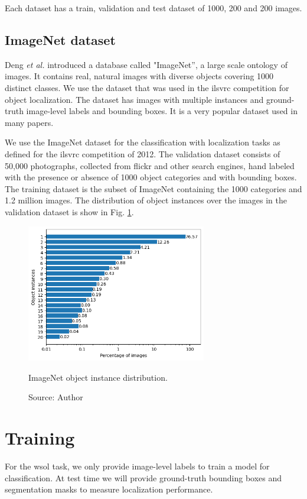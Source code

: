 Each dataset has a train, validation and test dataset of 1000, 200 and 200 images.

\subsection{ImageNet dataset}
Deng \textit{et al.} \cite{deng2009imagenet} introduced a database called "ImageNet”, a large scale ontology of images. It contains real, natural images with diverse objects covering 1000 distinct classes. We use the dataset that was used in the \acrfull{ilsvrc} competition for object localization. The dataset has images with multiple instances and ground-truth image-level labels and bounding boxes. It is a very popular dataset used in many papers.

We use the ImageNet dataset for the classification with localization tasks as defined for the \acrfull{ilsvrc} competition of 2012. The validation dataset consists of 50,000 photographs, collected from flickr and other search engines, hand labeled with the presence or absence of 1000 object categories and with bounding boxes. The training dataset is the subset of ImageNet containing the 1000 categories and 1.2 million images. The distribution of object instances over the images in the validation dataset is show in Fig. \ref{fig:imagenet_instance_distribution}.
\begin{figure}[ht]
    \begin{center}       
    \includegraphics[width=0.7\textwidth]{fig_imagenet_distrib.png}
    \caption[ImageNet object instance distribution]{ImageNet object instance distribution.}
    \caption*{Source: Author}
    \label{fig:imagenet_instance_distribution}
    \end{center}
\end{figure}

\section{Training}
For the \acrlong{wsol} task, we only provide image-level labels to train a model for classification. At test time we will provide ground-truth bounding boxes and segmentation masks  to measure localization performance.

